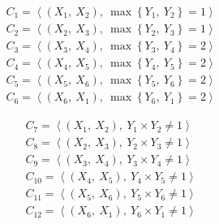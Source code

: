 \documentclass{article}
\begin{document}
\begin{fleqn}
\begin{equation}
\begin{aligned}
C_{1} = \left\langle \left( X_{1},\: X_{2} \right),\: \max\left\{ Y_{1},\: Y_{2} \right\} = 1 \right\rangle \\
C_{2} = \left\langle \left( X_{2},\: X_{3} \right),\: \max\left\{ Y_{2},\: Y_{3} \right\} = 1 \right\rangle \\
C_{3} = \left\langle \left( X_{3},\: X_{4} \right),\: \max\left\{ Y_{3},\: Y_{4} \right\} = 2 \right\rangle \\
C_{4} = \left\langle \left( X_{4},\: X_{5} \right),\: \max\left\{ Y_{4},\: Y_{5} \right\} = 2 \right\rangle \\
C_{5} = \left\langle \left( X_{5},\: X_{6} \right),\: \max\left\{ Y_{5},\: Y_{6} \right\} = 2 \right\rangle \\
C_{6} = \left\langle \left( X_{6},\: X_{1} \right),\: \max\left\{ Y_{6},\: Y_{1} \right\} = 2 \right\rangle
\end{aligned}
\end{equation}

\begin{equation}
\begin{aligned}
C_{7} = \left\langle \left( X_{1},\: X_{2} \right),\: Y_{1} \times Y_{2} \neq 1 \right\rangle \\
C_{8} = \left\langle \left( X_{2},\: X_{3} \right),\: Y_{2} \times Y_{3} \neq 1 \right\rangle \\
C_{9} = \left\langle \left( X_{3},\: X_{4} \right),\: Y_{3} \times Y_{4} \neq 1 \right\rangle \\
C_{10} = \left\langle \left( X_{4},\: X_{5} \right),\: Y_{4} \times Y_{5} \neq 1 \right\rangle \\
C_{11} = \left\langle \left( X_{5},\: X_{6} \right),\: Y_{5} \times Y_{6} \neq 1 \right\rangle \\
C_{12} = \left\langle \left( X_{6},\: X_{1} \right),\: Y_{6} \times Y_{1} \neq 1 \right\rangle
\end{aligned}
\end{equation}
\end{fleqn}







\subsection{}
\subsection{}
\end{document}
